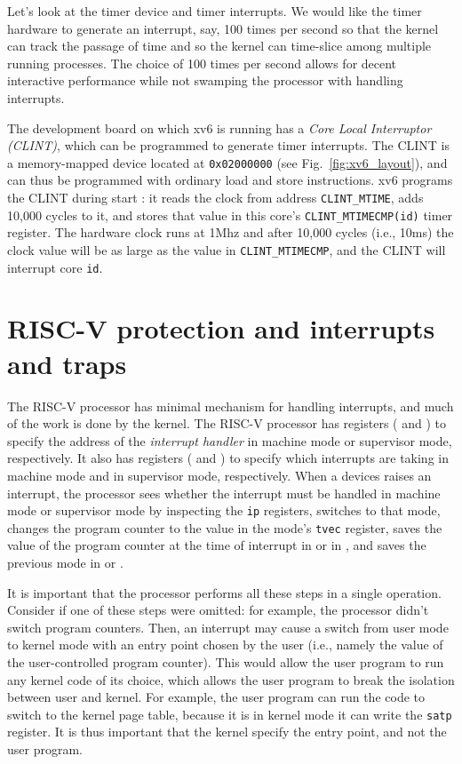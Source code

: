 Let's look at the timer device and timer interrupts.  We would like
the timer hardware to generate an interrupt, say, 100 times per
second so that the kernel can track the passage of time and so the
kernel can time-slice among multiple running processes.  The choice of
100 times per second allows for decent interactive performance while
not swamping the processor with handling interrupts.

The development board on which xv6 is running has a \textit{Core Local
  Interruptor (CLINT)}, which
can be programmed to generate timer interrupts.  The CLINT is a
memory-mapped device located at \lstinline{0x02000000} (see
Fig.~\ref{fig:xv6_layout}), and can thus be programmed with ordinary
load and store instructions.  xv6 programs the CLINT during start
: it reads the clock from address
\lstinline{CLINT_MTIME}, adds 10,000 cycles to it, and stores that
value in this core's \lstinline{CLINT_MTIMECMP(id)} timer register.
The hardware clock runs at 1Mhz and after 10,000 cycles (i.e., 10ms) the clock
value will be as large as the value in \lstinline{CLINT_MTIMECMP}, and
the CLINT will interrupt core \lstinline{id}.

\section{RISC-V protection and interrupts and traps}

The RISC-V processor has minimal mechanism for handling interrupts,
and much of the work is done by the kernel.  The RISC-V processor has
registers ( and
) to specify the
address of the \textit{interrupt handler} in
machine mode or supervisor mode, respectively.  It also has registers
( and
) to specify which
interrupts are taking in machine mode and in supervisor mode,
respectively.  When a devices raises an interrupt, the processor sees
whether the interrupt must be handled in machine mode or supervisor
mode by inspecting the \lstinline{ip} registers, switches to that
mode, changes the program counter to the value in the mode's
\lstinline{tvec} register, saves the value of the program counter at
the time of interrupt in 
or in , and saves the
previous mode in  or .

It is important that the processor performs all these steps in a
single operation.  Consider if one of these steps were omitted: for
example, the processor didn't switch program counters.  Then, an
interrupt may cause a switch from user mode to kernel mode with an
entry point chosen by the user (i.e., namely the value of the
user-controlled program counter).  This would allow the user program
to run any kernel code of its choice, which allows the user program to
break the isolation between user and kernel. For example, the user
program can run the code to switch to the kernel page table, because
it is in kernel mode it can write the \lstinline{satp} register.  It
is thus important that the kernel specify the entry point, and not the
user program.

